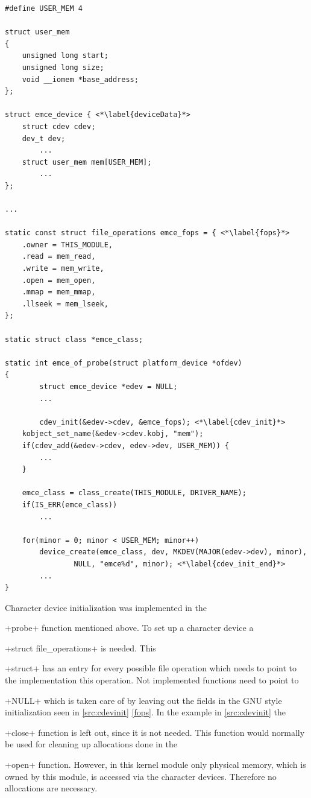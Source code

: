 \documentclass[12pt,a4paper,parskip=full,abstract=true,BCOR=12mm,twoside,open=right]{scrreprt}
\newcommand{\hack}{}
\newcommand*{\SavedLstInline}{}
\DeclareRobustCommand*{\lstinline}{%
  \ifmmode
    \let\SavedBGroup\bgroup
    \def\bgroup{%
      \let\bgroup\SavedBGroup
      \hbox\bgroup
    }%
  \fi
  \SavedLstInline
}
\begin{document}
\begin{lstlisting}[float=htbp,caption={Character device initialization},label=src:cdevinit,basicstyle=\hack\scriptsize]
#define USER_MEM 4

struct user_mem
{
	unsigned long start;
	unsigned long size;
	void __iomem *base_address;
};

struct emce_device { <*\label{deviceData}*>
	struct cdev cdev;
	dev_t dev;
        ...
	struct user_mem mem[USER_MEM];
        ...
};

...

static const struct file_operations emce_fops = { <*\label{fops}*>
	.owner = THIS_MODULE,
	.read = mem_read,
	.write = mem_write,
	.open = mem_open,
	.mmap = mem_mmap,
	.llseek = mem_lseek,
};

static struct class *emce_class;

static int emce_of_probe(struct platform_device *ofdev)
{
        struct emce_device *edev = NULL;
        ...

        cdev_init(&edev->cdev, &emce_fops); <*\label{cdev_init}*>
	kobject_set_name(&edev->cdev.kobj, "mem");
	if(cdev_add(&edev->cdev, edev->dev, USER_MEM)) {
		...
	}

	emce_class = class_create(THIS_MODULE, DRIVER_NAME);
	if(IS_ERR(emce_class))
		...

	for(minor = 0; minor < USER_MEM; minor++)
		device_create(emce_class, dev, MKDEV(MAJOR(edev->dev), minor),
				NULL, "emce%d", minor); <*\label{cdev_init_end}*>
        ...
}
\end{lstlisting}

Character device initialization was implemented in the \lstinline+probe+
function mentioned above. To set up a character device a
\lstinline+struct file_operations+\cite{ldd} is needed. This \lstinline+struct+
has an entry for every possible file operation which needs to point to the
implementation this operation. Not implemented functions need to
point to \lstinline+NULL+ which is taken care of by leaving out the fields
in the GNU style initialization seen in \cref{src:cdevinit} \cref{fops}. In
the example in \cref{src:cdevinit} the \lstinline+close+ function is left
out, since it is not needed. This function would normally be used for
cleaning up allocations done in the \lstinline+open+ function. However,
in this kernel module only physical memory, which is owned by this module,
is accessed via the character devices. Therefore no allocations are necessary.
\end{document}
